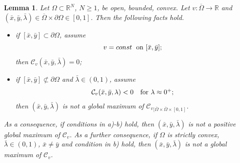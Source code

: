 \documentclass[11pt, reqno]{amsart}
\newtheorem{lemma}{Lemma}[section]
\theoremstyle{definition}
\numberwithin{equation}{section}
\newcommand{\R}{\mathbb{R}}
\newcommand{\mc}[1]{\mathcal{#1}}
\begin{document}
\begin{lemma}
\label{lemma_concav_bordo}
Let $\Omega \subset\R^N$, $N\geq 1$, be open, bounded, convex. Let $v:\overline{\Omega} \to \R$ and 
 $(\bar{x},\bar{y}, \bar{\lambda}) \in \overline{\Omega} \times \partial \Omega \in [0,1]$.
Then the following facts hold. 
\begin{itemize}
\item[a)] if $[\bar{x},\bar{y}] \subset\partial \Omega$, assume 
\begin{equation}\label{eq_cond_bordo_extra}
v=const \; \hbox{ on $[\bar{x},\bar{y}]$}; 
\end{equation}
then $\mc{C}_v(\bar{x},\bar{y}, \bar{\lambda})=0$;
\item[b)] if $[\bar{x},\bar{y}] \not \subset \partial \Omega$ and $\bar{\lambda} \in (0,1)$, assume
\begin{equation}\label{eq_cond_per_max_cont}
\mc{C}_v(\bar{x},\bar{y},\lambda) <0 \quad \hbox{for $\lambda \approx 0^+$};
\end{equation}
then $(\bar{x},\bar{y}, \bar{\lambda})$ is not a global maximum of $\mc{C}_v$$_{|\overline{\Omega} \times \overline{\Omega} \times [0,1]}$. 
\end{itemize}
As a consequence, if conditions in a)-b) hold, then $(\bar{x},\bar{y}, \bar{\lambda})$ is not a positive global maximum of $\mc{C}_v$. 
As a further consequence, if $\Omega$ is strictly convex, $\bar{\lambda}\in (0,1)$, $\bar{x}\neq \bar{y}$ and condition in b) hold, then $(\bar{x},\bar{y}, \bar{\lambda})$ is not a global maximum of $\mc{C}_v$.
\end{lemma}
\end{document}
